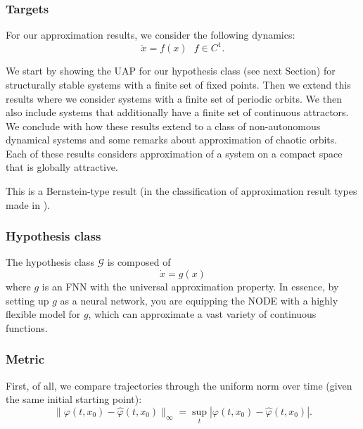 \documentclass{article}
\theoremstyle{definition}
\theoremstyle{remark}
\newcounter{ct}
\begin{document}
\subsubsection{Targets}
For our approximation results, we consider the following dynamics:
\begin{equation}
\dot x = f(x)   \ \ \ f\in C^1.
\end{equation}

We start by showing the UAP for our hypothesis class (see next Section) for structurally stable systems with a finite set of fixed points.
Then we extend this results where we consider systems with a finite set of periodic orbits.
We then also include systems that additionally have a finite set of continuous attractors.
We conclude with how these results extend to a class of non-autonomous dynamical systems and some remarks about approximation of chaotic orbits.
Each of these results considers approximation of a system on a compact space that is globally attractive. %

This is a Bernstein-type result (in the classification of approximation result types made in \citep{jiang2023brief}).

\subsubsection{Hypothesis class}
The hypothesis class $\mathcal{G}$ is composed of
\begin{equation}
\dot x = g(x) 
\end{equation}
where $g$ is an FNN with the universal approximation property.
In essence, by setting up $g$ as a neural network, you are equipping the NODE with a highly flexible model for $g$, which can approximate a vast variety of continuous functions. 


\subsubsection{Metric}
\citep{girard2007approximation}
First, of all, we compare trajectories through the uniform norm over time (given the same initial starting point):
\begin{equation}
\|\varphi(t,x_0)-\hat \varphi(t,x_0)\|_\infty = \sup_t|\varphi(t,x_0)-\hat \varphi(t,x_0)|.
\end{equation}
\end{document}
